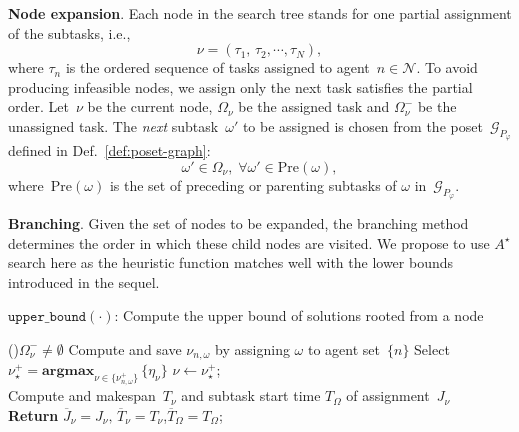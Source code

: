 \textbf{Node expansion}.
Each node in the search tree stands for one partial assignment of the
subtasks, i.e.,
\begin{equation}\label{eq:node}
\nu = (\tau_1,\,\tau_2,\cdots,\tau_N),
\end{equation}
where $\tau_n$ is the ordered sequence of tasks assigned to agent~$n\in \mathcal{N}$.
To avoid producing infeasible nodes, we assign only the next task satisfies
the partial order. Let~$\nu$ be the current node, $\Omega_\nu$ be the assigned
task and $\Omega^-_\nu$ be the unassigned task. The \emph{next} subtask~$\omega'$ 
to be assigned is chosen from the poset~$\mathcal{G}_{P_\varphi}$ defined in
 Def.~\ref{def:poset-graph}:
\begin{equation}\label{eq:next-task}
\omega' \in \Omega_\nu, \; \forall \omega' \in \text{Pre}(\omega),
\end{equation}
where~$\text{Pre}(\omega)$ is the set of preceding or parenting subtasks of $\omega$ in~$\mathcal{G}_{P_\varphi}$. 

\textbf{Branching}.
Given the set of nodes to be expanded,
the branching method determines the order in which these child nodes are
visited.
We propose to use $A^\star$ search here as the heuristic function matches well
with the lower bounds introduced in the sequel.
 

\begin{algorithm}[t]\footnotesize
\caption{$\texttt{upper\_bound}(\cdot)$: Compute the upper bound of solutions
rooted from a node}
\label{alg:upper_bound}
\While(\tcp*[f]{\eqref{eq:node-tasks}}){$\Omega^-_\nu \neq \emptyset$}{
{Compute and save $\nu_{n,\omega}$ by assigning $\omega$ to agent set~$\{n\}$ }
Select~$\nu^{+}_{\star}=\textbf{argmax}_{\nu\in \{\nu_{n,\omega}^+\}}\,\{\eta_{\nu}\}$
\label{algline:compute-eta}\tcp*{\eqref{eq:node-makespan}}
$\nu \leftarrow \nu^{+}_{\star}$; \label{algline:expand-node}\\
}
Compute and makespan~$T_\nu$ and subtask start time $T_\Omega$ of assignment~$J_\nu$ \\
\label{algline:return}
\textbf{Return} $\overline{J}_\nu=J_\nu,\, \overline{T}_\nu=T_\nu$,$\overline{T}_\Omega=T_\Omega$;\\
\end{algorithm}

